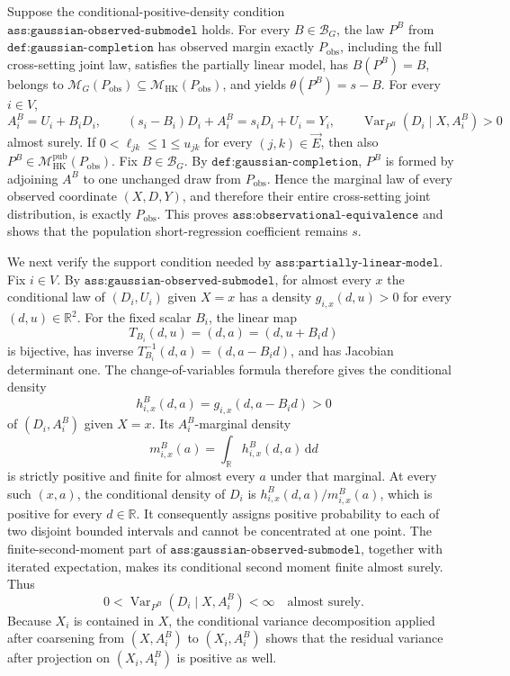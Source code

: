 Suppose the conditional-positive-density condition \(\texttt{ass:gaussian-observed-submodel}\) holds.  For every \(B\in\mathcal B_G\), the law \(P^B\) from \(\texttt{def:gaussian-completion}\) has observed margin exactly \(P_{\mathrm{obs}}\), including the full cross-setting joint law, satisfies the partially linear model, has \(B(P^B)=B\), belongs to \(\mathcal M_G(P_{\mathrm{obs}})\subseteq\mathcal M_{\mathrm{HK}}(P_{\mathrm{obs}})\), and yields \(\theta(P^B)=s-B\).  For every \(i\in V\),
\[
A_i^B=U_i+B_iD_i,
\qquad
(s_i-B_i)D_i+A_i^B=s_iD_i+U_i=Y_i,
\qquad
\operatorname{Var}_{P^B}(D_i\mid X,A_i^B)>0
\]
almost surely.  If \(0<\ell_{jk}\le1\le u_{jk}\) for every \((j,k)\in\vec E\), then also \(P^B\in\mathcal M_{\mathrm{HK}}^{\mathrm{pub}}(P_{\mathrm{obs}})\).
Fix \(B\in\mathcal B_G\).  By \(\texttt{def:gaussian-completion}\), \(P^B\) is formed by adjoining \(A^B\) to one unchanged draw from \(P_{\mathrm{obs}}\).  Hence the marginal law of every observed coordinate \((X,D,Y)\), and therefore their entire cross-setting joint distribution, is exactly \(P_{\mathrm{obs}}\).  This proves \(\texttt{ass:observational-equivalence}\) and shows that the population short-regression coefficient remains \(s\).

We next verify the support condition needed by \(\texttt{ass:partially-linear-model}\).  Fix \(i\in V\).  By \(\texttt{ass:gaussian-observed-submodel}\), for almost every \(x\) the conditional law of \((D_i,U_i)\) given \(X=x\) has a density \(g_{i,x}(d,u)>0\) for every \((d,u)\in\mathbb R^2\).  For the fixed scalar \(B_i\), the linear map
\[
T_{B_i}(d,u)=(d,a)=(d,u+B_id)
\]
is bijective, has inverse \(T_{B_i}^{-1}(d,a)=(d,a-B_id)\), and has Jacobian determinant one.  The change-of-variables formula therefore gives the conditional density
\[
h_{i,x}^B(d,a)=g_{i,x}(d,a-B_id)>0
\]
of \((D_i,A_i^B)\) given \(X=x\).  Its \(A_i^B\)-marginal density
\[
m_{i,x}^B(a)=\int_{\mathbb R}h_{i,x}^B(d,a)\,\mathrm d d
\]
is strictly positive and finite for almost every \(a\) under that marginal.  At every such \((x,a)\), the conditional density of \(D_i\) is \(h_{i,x}^B(d,a)/m_{i,x}^B(a)\), which is positive for every \(d\in\mathbb R\).  It consequently assigns positive probability to each of two disjoint bounded intervals and cannot be concentrated at one point.  The finite-second-moment part of \(\texttt{ass:gaussian-observed-submodel}\), together with iterated expectation, makes its conditional second moment finite almost surely.  Thus
\[
0<\operatorname{Var}_{P^B}(D_i\mid X,A_i^B)<\infty
\quad\text{almost surely}. \tag{1}
\]
Because \(X_i\) is contained in \(X\), the conditional variance decomposition applied after coarsening from \((X,A_i^B)\) to \((X_i,A_i^B)\) shows that the residual variance after projection on \((X_i,A_i^B)\) is positive as well.

